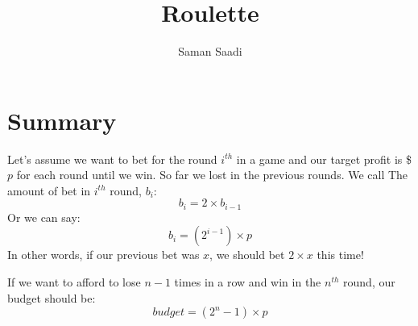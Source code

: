 \documentclass{book}
\title{Roulette}
\author{Saman Saadi}
\date{}
\begin{document}
	\frontmatter
	\maketitle
	\mainmatter
	\section{Summary}
	Let's assume we want to bet for the round $i^{th}$ in a game and our target profit is \$$p$ for each round until we win. So far we lost in the previous rounds. We call The amount of bet in $i^{th}$ round, $b_i$:
	\begin{equation*}
		b_i = 2 \times b_{i - 1}
	\end{equation*}
	Or we can say:
	\begin{equation*}
		b_i = (2^{i - 1}) \times p
	\end{equation*}
	In other words, if our previous bet was $x$, we should bet $2 \times x$ this time!
	\par If we want to afford to lose ${n - 1}$ times in a row and win in the $n^{th}$ round, our budget should be:
	\begin{equation*}
		budget = (2^n - 1) \times p
	\end{equation*}
\end{document}
